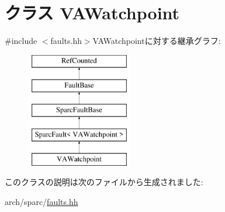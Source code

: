 \hypertarget{classSparcISA_1_1VAWatchpoint}{
\section{クラス VAWatchpoint}
\label{classSparcISA_1_1VAWatchpoint}
}


{\ttfamily \#include $<$faults.hh$>$}VAWatchpointに対する継承グラフ:\begin{figure}[H]
\begin{center}
\leavevmode
\includegraphics[height=5cm]{classSparcISA_1_1VAWatchpoint}
\end{center}
\end{figure}


このクラスの説明は次のファイルから生成されました:\begin{DoxyCompactItemize}
\item 
arch/sparc/\hyperlink{arch_2sparc_2faults_8hh}{faults.hh}\end{DoxyCompactItemize}
